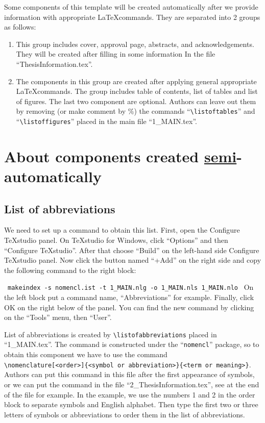 Some components of this template will be created automatically after we provide information with appropriate \LaTeX commands. They are separated into 2 groups as follows:
\begin{enumerate}[\quad1)]
	\item This group includes cover, approval page, abstracts, and acknowledgements. They will be created after filling in some information In the file “ThesisInformation.tex”.
	\item The components in this group are created after applying general appropriate \LaTeX commands. The group includes table of contents, list of tables and list of figures. The last two component are optional. Authors can leave out them by removing (or make comment by \%) the commands “\verb|\listoftables|” and “\verb|\listoffigures|” placed in the main file “1\_MAIN.tex”.
\end{enumerate}


\section{About components created \underline{semi}-automatically}



\subsection{List of abbreviations}
\subsectionindent We need to set up a command to obtain this list. First, open the Configure TeXstudio panel. On TeXstudio for Windows, click “Options” and then “Configure TeXstudio”. After that choose “Build” on the left-hand side Configure TeXstudio panel. Now click the button named “+Add” on the right side and copy the following command to the right block:\vskip2mm

\noindent~\hfill\verb|makeindex -s nomencl.ist -t 1_MAIN.nlg -o 1_MAIN.nls 1_MAIN.nlo|\hfill~\vskip2mm
\noindent On the left block put a command name, “Abbreviations” for example. Finally, click OK on the right below of the panel. You can find the new command by clicking on the “Tools” menu, then “User”.

\subsectionindent List of abbreviations is created by \verb|\listofabbreviations| placed in “1\_MAIN.tex”. The command is constructed under the “\verb|nomencl|” package, so to obtain this component we have to use the command \\[2mm]
\verb|\nomenclature[<order>]{<symbol or abbreviation>}{<term or meaning>}|.\\[2mm]
Authors can put this command in this file after the first appearance of symbols, or we can put the command in the file “2\_ThesisInformation.tex”, see at the end of the file for example. In the example, we use the numbers 1 and 2 in the order block to separate symbols and English alphabet. Then type the first two or three letters of symbols or abbreviations to order them in the list of abbreviations.

